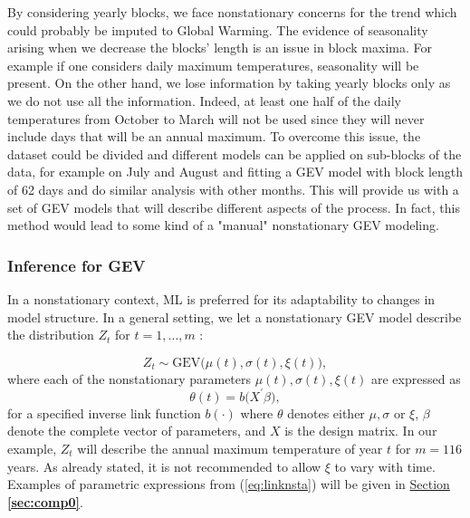 By considering yearly blocks, we face nonstationary concerns for the trend which could probably be imputed to Global Warming. 
The evidence of seasonality arising when we decrease the blocks' length is an issue in block maxima. For example if one considers daily maximum temperatures, seasonality will be present.
 On the other hand, we lose information by taking yearly blocks only as we do not use all the information. Indeed, at least one half of the daily temperatures from October to March will not be used since they will never include days that will be an annual maximum. To overcome this issue, the dataset could be divided and different models can be applied on sub-blocks of the data, for example on July and August and fitting a GEV model with block length of 62 days and do similar analysis with other months. This will provide us with a set of GEV models that will  describe different aspects of the process. In fact, this method would lead to some kind of a "manual" nonstationary GEV modeling.


\subsubsection*{Inference for GEV}

In a nonstationary context, ML is preferred for its adaptability to changes in model structure. In a general setting, we let a nonstationary GEV model describe the distribution $Z_t$ for $t=1,\ldots,m$ :

\begin{equation}\label{eq:gevnsta}
Z_t\sim \text{GEV}\big(\mu(t), \sigma(t),\xi(t)\big),
\end{equation}
where each of the nonstationary parameters $\mu(t),\sigma(t), \xi(t)$ are expressed as 
\begin{equation}\label{eq:linknsta}
\theta(t)=b\big(X^{'}\beta\big),
\end{equation}
for a specified inverse link function $b(\cdot)$ where $\theta$ denotes either $\mu,\sigma$ or $\xi$, $\beta$ denote the complete vector of parameters, and $X$ is the design matrix. In our example, $Z_t$ will describe the annual maximum temperature of year $t$ for $m=116$ years.
As already stated, it is not recommended to allow $\xi$ to vary with time. Examples of parametric expressions from (\ref{eq:linknsta}) will be given in \hyperref[sec:comp0]{Section \textbf{\ref{sec:comp0}}}.

